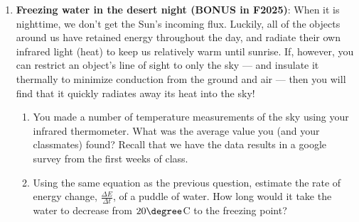 \documentclass[12pt]{article}
\begin{document}
\begin{enumerate}
\item {\bf Freezing water in the desert night (BONUS in F2025)}: When it is nighttime, we don't get the Sun's incoming flux.  Luckily, all of the objects around us have retained energy throughout the day, and radiate their own infrared light (heat) to keep us relatively warm until sunrise.    If, however, you can restrict an object's line of sight to only the sky --- and insulate it thermally to minimize conduction from the ground and air --- then you will find that it quickly radiates away its heat into the sky!  
	\begin{enumerate}
	\item You made a number of temperature measurements of the sky using your infrared thermometer.  What was the average value you (and your classmates) found?  Recall that we have the data results in a google survey from the first weeks of class.
	\item Using the same equation as the previous question, estimate the rate of energy change, $\frac{\Delta E}{\Delta t}$, of a puddle of water.  How long would it take the water to decrease from $20\degree$C to the freezing point?
	\end{enumerate}

\end{enumerate}
	







\end{document}

